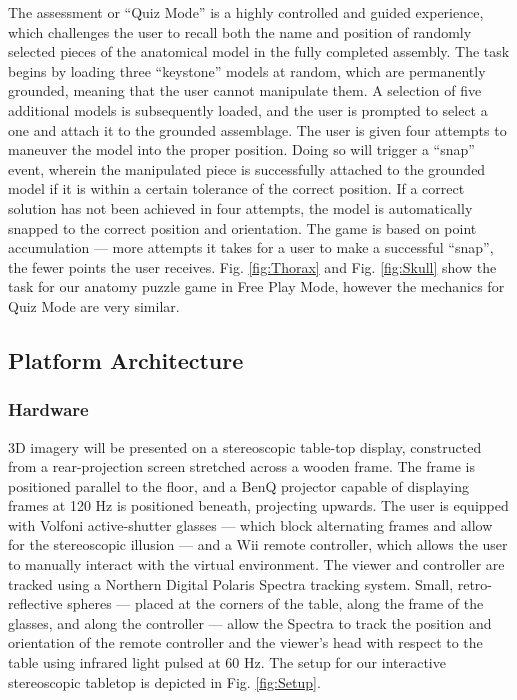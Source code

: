 \documentclass[]{spie}  %
\begin{document}
The assessment or “Quiz Mode” is a highly controlled and guided experience, which challenges the user to recall both the name and position of randomly selected pieces of the anatomical model in the fully completed assembly. The task begins by loading three “keystone” models at random, which are permanently grounded, meaning that the user cannot manipulate them. A selection of five additional models is subsequently loaded, and the user is prompted to select a one and attach it to the grounded assemblage. The user is given four attempts to maneuver the model into the proper position. Doing so will trigger a “snap” event, wherein the manipulated piece is successfully attached to the grounded model if it is within a certain tolerance of the correct position. If a correct solution has not been achieved in four attempts, the model is automatically snapped to the correct position and orientation. The game is based on point accumulation --- more attempts it takes for a user to make a successful ``snap'', the fewer points the user receives. Fig. \ref{fig:Thorax} and Fig. \ref{fig:Skull} show the task for our anatomy puzzle game in Free Play Mode, however the mechanics for Quiz Mode are very similar.

\subsection{Platform Architecture}

\subsubsection{Hardware}
3D imagery will be presented on a stereoscopic table-top display, constructed from a rear-projection screen stretched across a wooden frame. The frame is positioned parallel to the floor, and a BenQ projector capable of displaying frames at 120 Hz is positioned beneath, projecting upwards. The user is equipped with Volfoni active-shutter glasses --- which block alternating frames and allow for the stereoscopic illusion --- and a Wii remote controller, which allows the user to manually interact with the virtual environment. The viewer and controller are tracked using a Northern Digital Polaris Spectra tracking system. Small, retro-reflective spheres --- placed at the corners of the table, along the frame of the glasses, and along the controller --- allow the Spectra to track the position and orientation of the remote controller and the viewer’s head with respect to the table using infrared light pulsed at 60 Hz. The setup for our interactive stereoscopic tabletop is depicted in Fig. \ref{fig:Setup}.
\end{document}

